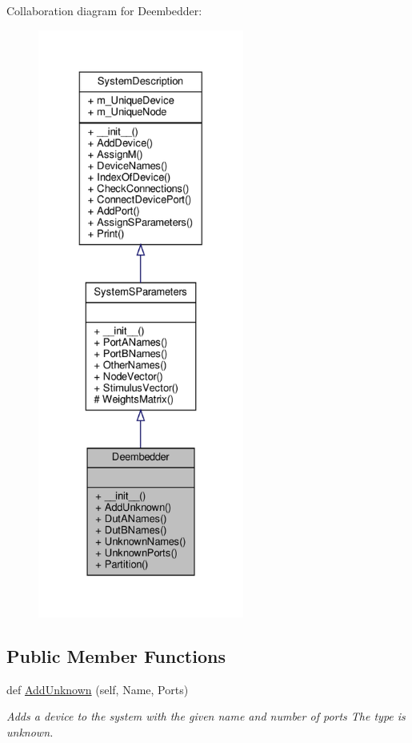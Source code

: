 Collaboration diagram for Deembedder\+:\nopagebreak
\begin{figure}[H]
\begin{center}
\leavevmode
\includegraphics[height=550pt]{classSignalIntegrity_1_1SystemDescriptions_1_1Deembedder_1_1Deembedder__coll__graph}
\end{center}
\end{figure}
\subsection*{Public Member Functions}
\begin{DoxyCompactItemize}
\item 
def \hyperlink{classSignalIntegrity_1_1SystemDescriptions_1_1Deembedder_1_1Deembedder_a5ce06adeeb4dc8990aede7800d72a081}{Add\+Unknown} (self, Name, Ports)
\begin{DoxyCompactList}\small\item\em Adds a device to the system with the given name and number of ports The type is \textquotesingle{}unknown\textquotesingle{}. \end{DoxyCompactList}\end{DoxyCompactItemize}
